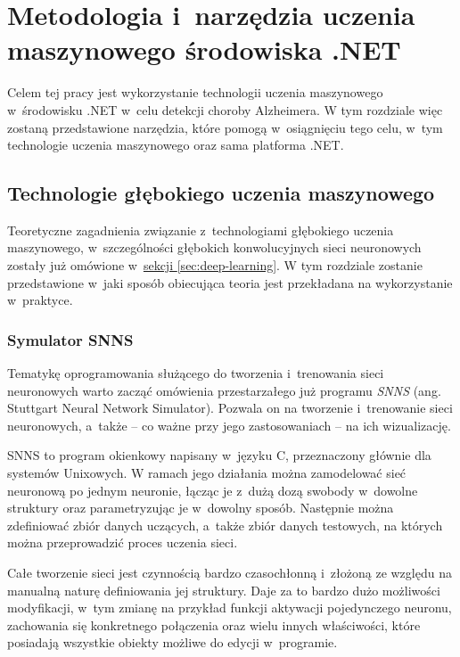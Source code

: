\chapter{Metodologia i~narzędzia uczenia maszynowego środowiska .NET}

Celem tej pracy jest wykorzystanie technologii uczenia maszynowego w~środowisku .NET w~celu detekcji choroby Alzheimera.
W tym rozdziale więc zostaną przedstawione narzędzia, które pomogą w~osiągnięciu tego celu, w~tym technologie uczenia maszynowego oraz sama platforma .NET.

\section{Technologie głębokiego uczenia maszynowego}

Teoretyczne zagadnienia związanie z~technologiami głębokiego uczenia maszynowego, w~szczególności głębokich konwolucyjnych sieci neuronowych zostały już omówione w~\hyperref[sec:deep-learning]{sekcji \ref*{sec:deep-learning}}.
W tym rozdziale zostanie przedstawione w~jaki sposób obiecująca teoria jest przekładana na wykorzystanie w~praktyce.

\subsection{Symulator SNNS}

Tematykę oprogramowania służącego do tworzenia i~trenowania sieci neuronowych warto zacząć omówienia przestarzałego już programu \emph{SNNS} (ang. Stuttgart Neural Network Simulator).
Pozwala on na tworzenie i~trenowanie sieci neuronowych, a~także -- co ważne przy jego zastosowaniach -- na ich wizualizację.

SNNS to program okienkowy napisany w~języku C, przeznaczony głównie dla systemów Unixowych.
W ramach jego działania można zamodelować sieć neuronową po jednym neuronie, łącząc je z~dużą dozą swobody w~dowolne struktury oraz parametryzując je w~dowolny sposób.
Następnie można zdefiniować zbiór danych uczących, a~także zbiór danych testowych, na których można przeprowadzić proces uczenia sieci.

Całe tworzenie sieci jest czynnością bardzo czasochłonną i~złożoną ze względu na manualną naturę definiowania jej struktury.
Daje za to bardzo dużo możliwości modyfikacji, w~tym zmianę na przykład funkcji aktywacji pojedynczego neuronu, zachowania się konkretnego połączenia oraz wielu innych właściwości, które posiadają wszystkie obiekty możliwe do edycji w~programie.


